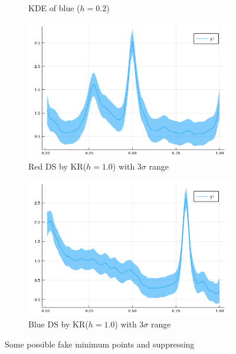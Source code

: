\documentclass{beamer}
\begin{document}
\begin{frame}
\begin{figure}[htb]
\begin{subfigure}[b]{0.24\linewidth}
    \caption{KDE of blue ($h=0.2$)}
  \end{subfigure}
  \begin{subfigure}[b]{0.24\linewidth}
    \includegraphics[width=\linewidth]{images/kde_reg_r.png}
    \caption{Red DS by KR($h=1.0$) with 3$\sigma$ range}
  \end{subfigure}
  \begin{subfigure}[b]{0.24\linewidth}
    \includegraphics[width=\linewidth]{images/kde_reg_b.png}
    \caption{Blue DS by KR($h=1.0$) with 3$\sigma$ range}
  \end{subfigure}
  \caption{Some possible fake minimum points and suppressing}
  \label{fig:DS_REG}
\end{figure}


\end{frame}
\end{document}
